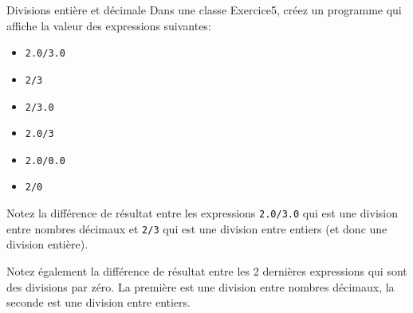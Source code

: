 \documentclass[a4paper,11pt]{article}
\begin{document}
	\begin{Exercice}{Divisions entière et décimale}
		Dans une classe Exercice5, créez un programme qui affiche la valeur des expressions suivantes:
	
		\begin{itemize}		
			\item \texttt{2.0/3.0}
			\item \texttt{2/3}
			\item \texttt{2/3.0}
			\item \texttt{2.0/3}
			\item \texttt{2.0/0.0}
			\item \texttt{2/0}
		\end{itemize}
	
		Notez la différence de résultat entre les expressions \texttt{2.0/3.0} qui est une division entre nombres décimaux 
		et \texttt{2/3} qui est une division entre entiers (et donc une division entière).
	
		Notez également la différence de résultat entre les 2 dernières expressions qui sont des divisions par zéro.
		La première est une division entre nombres décimaux,
		la seconde est une division entre entiers.
	\end{Exercice}
%
\end{document}
